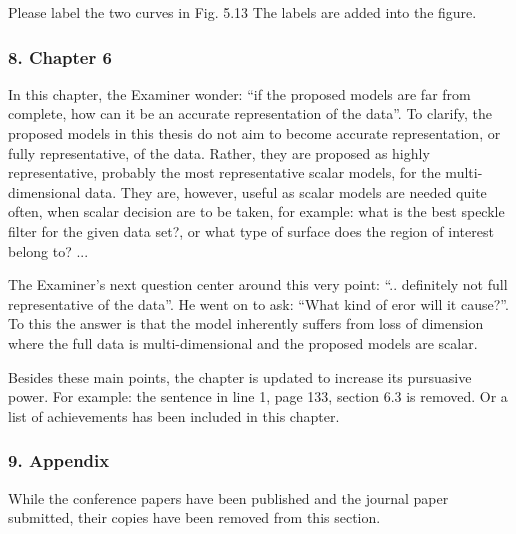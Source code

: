 \replyToComment
    {Please label the two curves in Fig. 5.13}
    {The labels are added into the figure.}    
    
%
%
%
%

\subsubsection*{8. Chapter 6}

In this chapter, the Examiner wonder: ``if the proposed models are far from complete, how can it be an accurate representation of the data''.
To clarify, the proposed models in this thesis do not aim to become accurate representation, or fully representative, of the data.
Rather, they are proposed as highly representative, probably the most representative scalar models, for the multi-dimensional data.
They are, however, useful as scalar models are needed quite often, when scalar decision are to be taken,
  for example: what is the best speckle filter for the given data set?, or what type of surface does the region of interest belong to? ...

The Examiner's next question center around this very point: ``.. definitely not full representative of the data''.
He went on to ask: ``What kind of eror will it cause?''.
To this the answer is that the model inherently suffers from loss of dimension
  where the full data is multi-dimensional and the proposed models are scalar.

Besides these main points, the chapter is updated to increase its pursuasive power.
For example: the sentence in line 1, page 133, section 6.3 is removed.
Or a list of achievements has been included in this chapter.

\subsubsection*{9. Appendix}

While the conference papers have been published and the journal paper submitted,
  their copies have been removed from this section.



